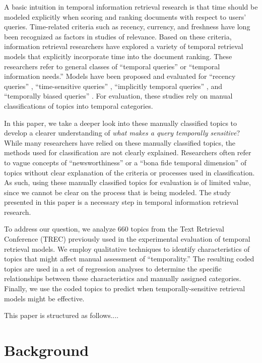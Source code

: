 \documentclass[runningheads,a4paper]{llncs}
\begin{document}
A basic intuition in temporal information retrieval research is that time should be modeled explicitly when scoring and ranking documents with respect to users' queries. Time-related criteria such as recency, currency, and freshness have long been recognized as factors in studies of relevance\cite{Barry1998}. Based on these criteria, information retrieval researchers have explored a variety of temporal retrieval models \cite{Li2003,Efron2011,Dakka2012} that explicitly incorporate time into the document ranking. These researchers refer to general classes of ``temporal queries'' or ``temporal information needs.''  Models have been proposed and evaluated for ``recency queries'' \cite{Li2003,Efron2011}, ``time-sensitive queries'' \cite{Dakka2012}, ``implicitly temporal queries'' \cite{Metzler2009}, and ``temporally biased queries'' \cite{Jones2007}. For evaluation, these studies rely on manual classifications of topics into temporal categories.

In this paper, we take a deeper look into these manually classified topics to develop a clearer understanding of \emph{what makes a query temporally sensitive}? While many researchers have relied on these manually classified topics, the methods used for classification are not clearly explained.  Researchers often refer to vague concepts of ``newsworthiness'' or a ``bona fide temporal dimension'' of topics without clear explanation of the criteria or processes used in classification. As such, using these manually classified topics for evaluation is of limited value, since we cannot be clear on the process that is being modeled. The study presented in this paper is a necessary step in temporal information retrieval research.

To address our question, we analyze  660 topics from the Text Retrieval Conference (TREC) previously used in the experimental evaluation of temporal retrieval models. We employ qualitative techniques to identify characteristics of topics that might affect manual assessment of ``temporality.'' The resulting coded topics are used in a set of regression analyses to determine the specific relationships between these characteristics and manually assigned categories. Finally, we use the coded topics to predict when temporally-sensitive retrieval models might be effective.

This paper is structured as follows....

\section{Background}
\end{document}
